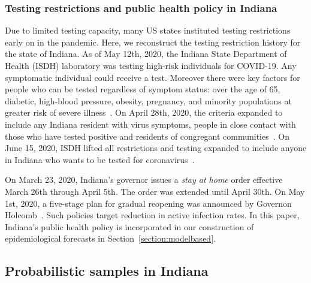 \documentclass[11pt]{amsart}
\numberwithin{equation}{section}
\theoremstyle{plain}
\begin{document}
\subsubsection{Testing restrictions and public health policy in Indiana}

Due to limited testing capacity, many US states instituted testing restrictions early on in the pandemic.
Here, we reconstruct the testing restriction history for the state of Indiana. As of May 12th, 2020, the Indiana State Department of Health (ISDH) laboratory was testing high-risk individuals for COVID-19. Any symptomatic individual could receive a test.  Moreover there were key factors for people who can be tested regardless of symptom status: over the age of 65, diabetic, high-blood pressure, obesity, pregnancy, and minority populations at greater risk of severe illness~\citep{indystar2020}.
On April 28th, 2020, the criteria expanded to include any Indiana resident with virus symptoms, people in close contact with those who have tested positive and residents of congregant communities~\citep{wishtv2020}.
On June 15, 2020, ISDH lifted all restrictions and testing expanded to include anyone in Indiana who wants to be tested for coronavirus~\citep{indystar2020v2}.

On March 23, 2020, Indiana's governor issues a \emph{stay at home} order effective March 26th through April 5th.  The order was extended until April 30th. On May 1st, 2020, a five-stage plan for gradual reopening was announced by Governon Holcomb~\citep{fivestageplan}.  Such policies target reduction in active infection rates. In this paper, Indiana's public health policy is incorporated in our construction of epidemiological forecasts in Section~\ref{section:modelbased}.


\subsection{Probabilistic samples in Indiana}
\end{document}
